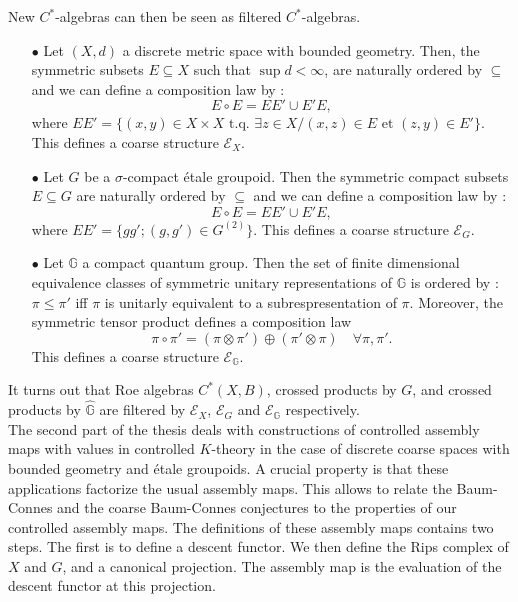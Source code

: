 New $C^*$-algebras can then be seen as filtered $C^*$-algebras. \\

\begin{itemize} 
\item[$\bullet$] Let $(X,d)$ a discrete metric space with bounded geometry. Then, the symmetric subsets $E\subseteq X$ such that $\sup d<\infty$, are naturally ordered by $\subseteq$ and we can define a composition law by :
\[E\circ E = EE'\cup E'E,\]
where $EE' = \{(x,y)\in X\times X \text{ t.q. }\exists z\in X / (x,z)\in E \text{ et }(z,y)\in E'\}$. This defines a coarse structure $\mathcal E_X$.
\item[$\bullet$] Let $G$ be a $\sigma$-compact étale groupoid. Then the symmetric compact subsets $E\subseteq G$ are naturally ordered by $\subseteq$ and we can define a composition law by :
\[E\circ E = EE'\cup E'E,\]
where $EE' = \{gg' ; (g,g')\in G^{(2)}\}$. This defines a coarse structure $\mathcal E_G$.
\item[$\bullet$] Let $\mathbb G$ a compact quantum group. Then the set of finite dimensional equivalence classes of symmetric unitary representations of $\mathbb G$ is ordered by : $\pi\leq \pi'$ iff $\pi$ is unitarly equivalent to a subrespresentation of $\pi$. Moreover, the symmetric tensor product defines a composition law
\[\pi\circ \pi' = (\pi\otimes\pi' )\oplus (\pi'\otimes \pi) \quad \forall \pi,\pi'.\] This defines a coarse structure $\mathcal E_{\mathbb G}$.\\
\end{itemize} 

It turns out that Roe algebras $C^*(X,B)$, crossed products by $G$, and crossed products by $\hat{\mathbb G}$ are filtered by $\mathcal E_X$, $\mathcal E_G$ and $\mathcal E_{\mathbb G}$ respectively.\\

The second part of the thesis deals with constructions of controlled assembly maps with values in controlled $K$-theory in the case of discrete coarse spaces with bounded geometry and étale groupoids. A crucial property is that these applications factorize the usual assembly maps. This allows to relate the Baum-Connes and the coarse Baum-Connes conjectures to the properties of our controlled assembly maps. The definitions of these assembly maps contains two steps. The first is to define a descent functor. We then define the Rips complex of $X$ and $G$, and a canonical projection. The assembly map is the evaluation of the descent functor at this projection. \\

